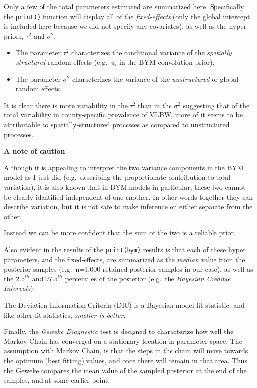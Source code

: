 \documentclass[
]{book}
\providecommand{\tightlist}{%
  \setlength{\itemsep}{0pt}\setlength{\parskip}{0pt}}
\newenvironment{rmdcaution}[1]
  {
  \begin{itemize}
  \renewcommand{\labelitemi}{
    \raisebox{-.7\height}[0pt][0pt]{
      {\setkeys{Gin}{width=3em,keepaspectratio}\texttt{[image: images/\#1]}}
    }
  }
  \setlength{\fboxsep}{1em}
  \begin{caution}
  \item
  }
  {
  \end{caution}
  \end{itemize}
  }
\begin{document}
Only a few of the total parameters estimated are summarized here. Specifically the \texttt{print()} function will display all of the \emph{fixed-effects} (only the global intercept is included here because we did not specify any covariates), as well as the hyper priors, \(\tau^2\) and \(\sigma^2\).

\begin{itemize}
\tightlist
\item
  The parameter \(\tau^2\) characterizes the conditional variance of the \emph{spatially structured} random effects (e.g.~\(u_i\) in the BYM convolution prior).
\item
  The parameter \(\sigma^2\) characterizes the variance of the \emph{unstructured} or global random effects.
\end{itemize}

It is clear there is more variability in the \(\tau^2\) than in the \(\sigma^2\) suggesting that of the total variability in county-specific prevalence of VLBW, more of it seems to be attributable to spatially-structured processes as compared to unstructured processes.

\begin{rmdcaution}{caution}
\textbf{A note of caution}

Although it is appealing to interpret the two variance components in the BYM model as I just did (e.g.~describing the proportionate contribution to total variation), it is also known that in BYM models in particular, these two cannot be clearly identified independent of one another. In other words together they can describe variation, but it is not safe to make inference on either separate from the other.

Instead we can be more confident that the sum of the two is a reliable prior.

\end{rmdcaution}

Also evident in the results of the \texttt{print(bym)} results is that each of these hyper parameters, and the fixed-effects, are summarized as the \emph{median} value from the posterior samples (e.g.~n=1,000 retained posterior samples in our case), as well as the \(2.5^{th}\) and \(97.5^{th}\) percentiles of the posterior (e.g.~the \emph{Bayesian Credible Intervals}).

The Deviation Information Criteria (DIC) is a Bayesian model fit statistic, and like other fit statistics, \emph{smaller is better}.

Finally, the \emph{Geweke Diagnostic} test is designed to characterize how well the Markov Chain has converged on a stationary location in parameter space. The assumption with Markov Chain, is that the steps in the chain will move towards the optimum (best fitting) values, and once there will remain in that area. Thus the Geweke compares the mean value of the sampled posterior at the end of the samples, and at some earlier point.
\end{document}
